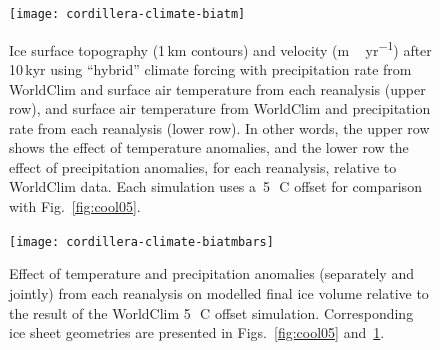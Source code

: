 \documentclass[tc, ms]{copernicus}
\begin{document}
\begin{figure}[t]
	\vspace*{2mm}
	\begin{center}
		\texttt{[image: cordillera-climate-biatm]}
	\end{center}
	\caption{Ice surface topography (1\,\unit{km} contours) and velocity (\unit{m\,yr^{-1}}) after 10\,kyr using “hybrid” climate forcing with precipitation rate from WorldClim and surface air temperature from each reanalysis (upper row), and surface air temperature from WorldClim and precipitation rate from each reanalysis (lower row). In other words, the upper row shows the effect of temperature anomalies, and the lower row the effect of precipitation anomalies, for each reanalysis, relative to WorldClim data. Each simulation uses a~5\,\unit{{\degree}C} offset for comparison with Fig.~\ref{fig:cool05}.}
	\label{fig:biatm}
\end{figure}

\begin{figure}[t]
	\vspace*{2mm}
	\begin{center}
		\texttt{[image: cordillera-climate-biatmbars]}
	\end{center}
	\caption{Effect of temperature and precipitation anomalies (separately and jointly) from each reanalysis on modelled final ice volume relative to the result of the WorldClim 5\,\unit{{\degree}C} offset simulation. Corresponding ice sheet geometries are presented in Figs.~\ref{fig:cool05} and~\ref{fig:biatm}.}
	\label{fig:biatmbars}
\end{figure}
\end{document}
